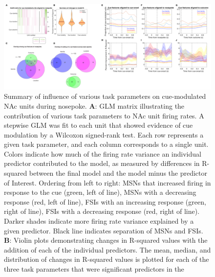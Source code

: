 \documentclass[11pt]{article}
\newcommand{\bsf}[1]{\textbf{#1}}
\begin{document}
 \begin{figure}[ht!]
\centering
\includegraphics[width=\textwidth]{Fig 10 - NP GLM.pdf}
\caption{Summary of influence of various task parameters on cue-modulated NAc
units during nosepoke. \bsf{A}: GLM matrix illustrating the contribution of various
task parameters to NAc unit firing rates. A stepwise GLM was fit to each unit that
showed evidence of cue modulation by a Wilcoxon signed-rank test. Each row
represents a given task parameter, and each column corresponds to a single unit. Colors indicate how much of the firing rate variance an
individual predictor contributed to the model, as measured by differences in
R-squared between the final model and the model minus the predictor of
Interest. Ordering from left to right: MSNs that increased firing
in response to the cue (green, left of line), MSNs with a decreasing response
(red, left of line), FSIs with an increasing response (green, right of line),
FSIs with a decreasing response (red, right of line). Darker shades indicate
more firing rate variance explained by a given predictor. Black line indicates
separation of MSNs and FSIs. \bsf{B}: Violin plots demonstrating changes in
R-squared values with the addition of each of the individual predictors. The
mean, median, and distribution of changes in R-squared values is plotted for
each of the three task parameters that were significant predictors in the
}
\end{figure}
\end{document}
